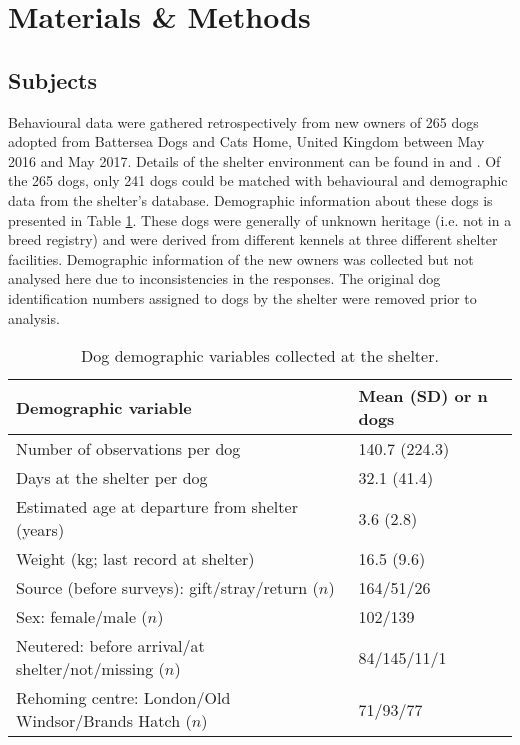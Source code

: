 \documentclass[12pt]{article}
\begin{document}
\section{Materials \& Methods}

\subsection{Subjects}
Behavioural data were gathered retrospectively from new owners of 265 dogs adopted from Battersea Dogs and Cats Home, United Kingdom between May 2016 and May 2017. Details of the shelter environment can be found in \textcite{goold2017aggressiveness} and \textcite{goold2017modelling}. Of the 265 dogs, only 241 dogs could be matched with behavioural and demographic data from the shelter's database. Demographic information about these dogs is presented in Table \ref{table_demoshelter}. These dogs were generally of unknown heritage (i.e. not in a breed registry) and were derived from different kennels at three different shelter facilities. Demographic information of the new owners was collected but not analysed here due to inconsistencies in the responses. The original dog identification numbers assigned to dogs by the shelter were removed prior to analysis.

\begin{table}
  \centering
  \begin{tabular}{ll}
  \textbf{Demographic variable} & \textbf{Mean (SD) or $\boldsymbol{n}$ dogs}\\ \hline
  Number of observations per dog & 140.7 (224.3) \\
  Days at the shelter per dog & 32.1 (41.4)\\
  Estimated age at departure from shelter (years) & 3.6 (2.8)\\
  Weight (kg; last record at shelter) & 16.5 (9.6)\\
  Source (before surveys): gift/stray/return ($n$) & 164/51/26\\
  Sex: female/male ($n$) & 102/139\\
  Neutered: before arrival/at shelter/not/missing ($n$) & 84/145/11/1\\
  Rehoming centre: London/Old Windsor/Brands Hatch ($n$) & 71/93/77\\
  \hline
  \end{tabular}
  \caption{Dog demographic variables collected at the shelter.}
  \label{table_demoshelter}
\end{table}
\end{document}
